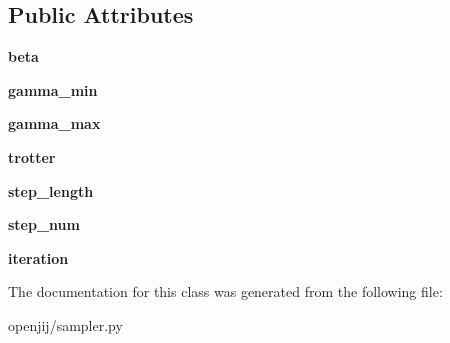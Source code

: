 \subsection*{Public Attributes}
\begin{DoxyCompactItemize}
\item 
\mbox{\label{classopenjij_1_1sampler_1_1_s_q_a_sampler_a5e74983a948a696b70544a715bad1da0}} 
{\bfseries beta}
\item 
\mbox{\label{classopenjij_1_1sampler_1_1_s_q_a_sampler_a3d7ce8ddc4131495fa10aad7ec7a5746}} 
{\bfseries gamma\+\_\+min}
\item 
\mbox{\label{classopenjij_1_1sampler_1_1_s_q_a_sampler_ae7423248d4b8e9a5bd073ad206124c9c}} 
{\bfseries gamma\+\_\+max}
\item 
\mbox{\label{classopenjij_1_1sampler_1_1_s_q_a_sampler_a67cc763cc748b27502a38ea8234c987c}} 
{\bfseries trotter}
\item 
\mbox{\label{classopenjij_1_1sampler_1_1_s_q_a_sampler_a4e0ca9a353ad47fccd448815b4fdca8b}} 
{\bfseries step\+\_\+length}
\item 
\mbox{\label{classopenjij_1_1sampler_1_1_s_q_a_sampler_a499aeb035cf2657bf19e995ff78784f3}} 
{\bfseries step\+\_\+num}
\item 
\mbox{\label{classopenjij_1_1sampler_1_1_s_q_a_sampler_a5c39809ac582942d822df5d6ae3e9ca9}} 
{\bfseries iteration}
\end{DoxyCompactItemize}


The documentation for this class was generated from the following file\+:\begin{DoxyCompactItemize}
\item 
openjij/sampler.\+py\end{DoxyCompactItemize}
